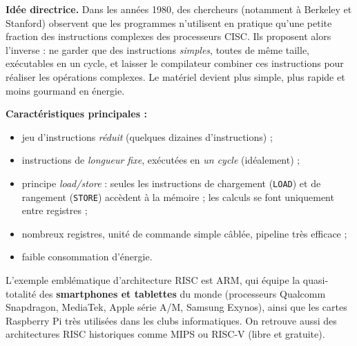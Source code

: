 \documentclass[11pt]{article}
\newcommand{\cle}[1]{{\popxbold\color{popdark}#1}}
\begin{document}
\textbf{Idée directrice.} Dans les années 1980, des chercheurs (notamment à Berkeley et Stanford) observent que les programmes n'utilisent en pratique qu'une petite fraction des instructions complexes des processeurs CISC. Ils proposent alors l'inverse : ne garder que des instructions \emph{simples}, toutes de même taille, exécutables en un cycle, et laisser le compilateur combiner ces instructions pour réaliser les opérations complexes. Le matériel devient plus simple, plus rapide et moins gourmand en énergie.

\textbf{Caractéristiques principales :}
\begin{itemize}
  \item jeu d'instructions \emph{réduit} (quelques dizaines d'instructions) ;
  \item instructions de \emph{longueur fixe}, exécutées en \emph{un cycle} (idéalement) ;
  \item principe \emph{load/store} : seules les instructions de chargement (\texttt{LOAD}) et de rangement (\texttt{STORE}) accèdent à la mémoire ; les calculs se font uniquement entre registres ;
  \item nombreux registres, unité de commande simple câblée, pipeline très efficace ;
  \item faible consommation d'énergie.
\end{itemize}

\begin{exemplebox}
L'exemple emblématique d'architecture RISC est \cle{ARM}, qui équipe la quasi-totalité des \textbf{smartphones et tablettes} du monde (processeurs Qualcomm Snapdragon, MediaTek, Apple série A/M, Samsung Exynos), ainsi que les cartes Raspberry Pi très utilisées dans les clubs informatiques. On retrouve aussi des architectures RISC historiques comme MIPS ou RISC-V (libre et gratuite).
\end{exemplebox}
\end{document}
